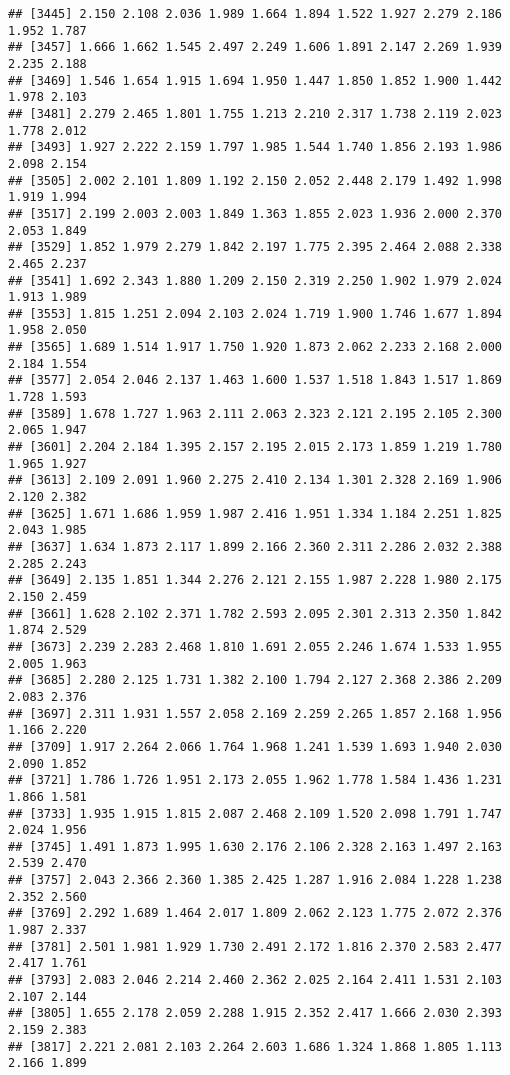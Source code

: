 \documentclass[
]{article}
\begin{document}
\begin{verbatim}
## [3445] 2.150 2.108 2.036 1.989 1.664 1.894 1.522 1.927 2.279 2.186 1.952 1.787
## [3457] 1.666 1.662 1.545 2.497 2.249 1.606 1.891 2.147 2.269 1.939 2.235 2.188
## [3469] 1.546 1.654 1.915 1.694 1.950 1.447 1.850 1.852 1.900 1.442 1.978 2.103
## [3481] 2.279 2.465 1.801 1.755 1.213 2.210 2.317 1.738 2.119 2.023 1.778 2.012
## [3493] 1.927 2.222 2.159 1.797 1.985 1.544 1.740 1.856 2.193 1.986 2.098 2.154
## [3505] 2.002 2.101 1.809 1.192 2.150 2.052 2.448 2.179 1.492 1.998 1.919 1.994
## [3517] 2.199 2.003 2.003 1.849 1.363 1.855 2.023 1.936 2.000 2.370 2.053 1.849
## [3529] 1.852 1.979 2.279 1.842 2.197 1.775 2.395 2.464 2.088 2.338 2.465 2.237
## [3541] 1.692 2.343 1.880 1.209 2.150 2.319 2.250 1.902 1.979 2.024 1.913 1.989
## [3553] 1.815 1.251 2.094 2.103 2.024 1.719 1.900 1.746 1.677 1.894 1.958 2.050
## [3565] 1.689 1.514 1.917 1.750 1.920 1.873 2.062 2.233 2.168 2.000 2.184 1.554
## [3577] 2.054 2.046 2.137 1.463 1.600 1.537 1.518 1.843 1.517 1.869 1.728 1.593
## [3589] 1.678 1.727 1.963 2.111 2.063 2.323 2.121 2.195 2.105 2.300 2.065 1.947
## [3601] 2.204 2.184 1.395 2.157 2.195 2.015 2.173 1.859 1.219 1.780 1.965 1.927
## [3613] 2.109 2.091 1.960 2.275 2.410 2.134 1.301 2.328 2.169 1.906 2.120 2.382
## [3625] 1.671 1.686 1.959 1.987 2.416 1.951 1.334 1.184 2.251 1.825 2.043 1.985
## [3637] 1.634 1.873 2.117 1.899 2.166 2.360 2.311 2.286 2.032 2.388 2.285 2.243
## [3649] 2.135 1.851 1.344 2.276 2.121 2.155 1.987 2.228 1.980 2.175 2.150 2.459
## [3661] 1.628 2.102 2.371 1.782 2.593 2.095 2.301 2.313 2.350 1.842 1.874 2.529
## [3673] 2.239 2.283 2.468 1.810 1.691 2.055 2.246 1.674 1.533 1.955 2.005 1.963
## [3685] 2.280 2.125 1.731 1.382 2.100 1.794 2.127 2.368 2.386 2.209 2.083 2.376
## [3697] 2.311 1.931 1.557 2.058 2.169 2.259 2.265 1.857 2.168 1.956 1.166 2.220
## [3709] 1.917 2.264 2.066 1.764 1.968 1.241 1.539 1.693 1.940 2.030 2.090 1.852
## [3721] 1.786 1.726 1.951 2.173 2.055 1.962 1.778 1.584 1.436 1.231 1.866 1.581
## [3733] 1.935 1.915 1.815 2.087 2.468 2.109 1.520 2.098 1.791 1.747 2.024 1.956
## [3745] 1.491 1.873 1.995 1.630 2.176 2.106 2.328 2.163 1.497 2.163 2.539 2.470
## [3757] 2.043 2.366 2.360 1.385 2.425 1.287 1.916 2.084 1.228 1.238 2.352 2.560
## [3769] 2.292 1.689 1.464 2.017 1.809 2.062 2.123 1.775 2.072 2.376 1.987 2.337
## [3781] 2.501 1.981 1.929 1.730 2.491 2.172 1.816 2.370 2.583 2.477 2.417 1.761
## [3793] 2.083 2.046 2.214 2.460 2.362 2.025 2.164 2.411 1.531 2.103 2.107 2.144
## [3805] 1.655 2.178 2.059 2.288 1.915 2.352 2.417 1.666 2.030 2.393 2.159 2.383
## [3817] 2.221 2.081 2.103 2.264 2.603 1.686 1.324 1.868 1.805 1.113 2.166 1.899

\end{verbatim}
\end{document}
